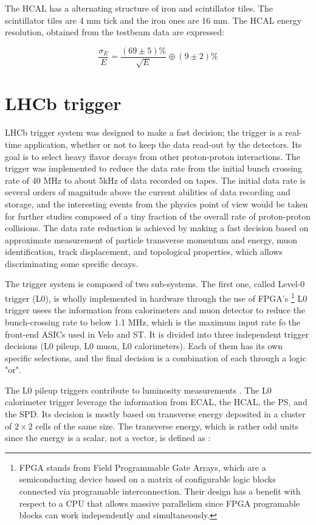 The HCAL has a alternating structure of iron and scintillator tiles. The scintillator tiles are 4 mm tick and the iron ones are 16 mm. The HCAL energy resolution, obtained from the testbeam data are expressed: 

\begin{equation}
    \frac{\sigma_E}{E} = \frac{(69\pm 5) \%}{\sqrt{E}} \oplus (9\pm 2) \%
\end{equation}
 
\section{LHCb trigger}
\label{sec:trigger}
LHCb trigger system was designed to make a fast decision; the trigger is a real-time application, whether or not to keep the data read-out by the detectors. Its goal is to select heavy flavor decays from other proton-proton interactions. The trigger was implemented to reduce the data rate from the initial bunch crossing rate of 40 MHz to about 5kHz of data recorded on tapes. The initial data rate is several orders of magnitude above the current abilities of data recording and storage, and the interesting events from the physics point of view would be taken for further studies composed of a tiny fraction of the overall rate of proton-proton collisions.  The data rate reduction is achieved by making a fast decision based on approximate measurement of particle transverse momentum and energy, muon identification, track displacement, and topological properties, which allows discriminating some specific decays. 

The trigger system is composed of two sub-systems. The first one, called Level-0 trigger (L0), is wholly implemented in hardware through the use of FPGA's \footnote{FPGA stands from Field Programmable Gate Arrays, which are a semiconducting device based on a matrix of configurable logic blocks connected via programable interconnection. Their design has a benefit with respect to a CPU that allows massive parallelism since FPGA programable blocks can work independently and simultaneously. } L0 trigger usees the information from calorimeters and muon detector to reduce the bunch-crossing rate to below 1.1 MHz, which is the maximum input rate fo the front-end ASICs used in Velo and ST.  It is divided into three independent trigger decisions (L0 pileup, L0 muon, L0 calorimeters). Each of them has its own specific selections, and the final decision is a combination of each through a logic "or". 

The L0 pileup triggers contribute to luminosity measurements \cite{trigger}.
The L0 calorimeter trigger leverage the information from ECAL, the HCAL, the PS, and the SPD. Its decision is mostly based on transverse energy deposited in a cluster of $2\times 2$ cells of the same size. The transverse energy, which is rather odd units since the energy is a scalar, not a vector, is defined as :

